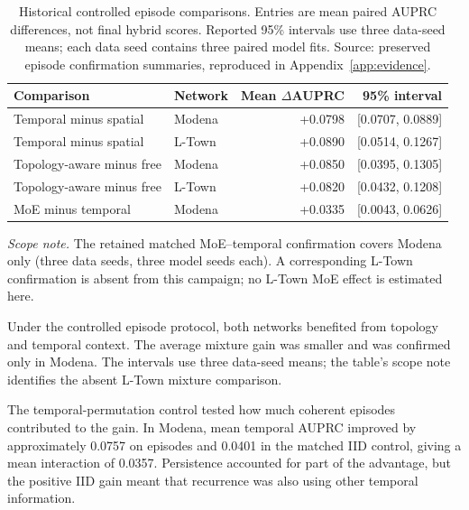 \begin{table}[tbp]
\centering\small
\caption[Historical controlled episode comparisons]{Historical controlled episode comparisons. Entries are mean paired AUPRC differences, not final hybrid scores. Reported 95\% intervals use three data-seed means; each data seed contains three paired model fits. Source: preserved episode confirmation summaries, reproduced in Appendix~\ref{app:evidence}.}
\label{tab:historical}
\begin{tabular}{@{}llrr@{}}
\toprule
Comparison & Network & Mean $\Delta$AUPRC & 95\% interval\\
\midrule
Temporal minus spatial & Modena & +0.0798 & [0.0707, 0.0889]\\
Temporal minus spatial & L-Town & +0.0890 & [0.0514, 0.1267]\\
Topology-aware minus free & Modena & +0.0850 & [0.0395, 0.1305]\\
Topology-aware minus free & L-Town & +0.0820 & [0.0432, 0.1208]\\
MoE minus temporal & Modena & +0.0335 & [0.0043, 0.0626]\\
\bottomrule
\end{tabular}
\par\smallskip\begin{minipage}{\linewidth}\footnotesize\textit{Scope note.} The retained matched MoE--temporal confirmation covers Modena only (three data seeds, three model seeds each). A corresponding L-Town confirmation is absent from this campaign; no L-Town MoE effect is estimated here.\end{minipage}
\end{table}

Under the controlled episode protocol, both networks benefited from topology and temporal context. The average mixture gain was smaller and was confirmed only in Modena. The intervals use three data-seed means; the table's scope note identifies the absent L-Town mixture comparison.


The temporal-permutation control tested how much coherent episodes contributed to the gain. In Modena, mean temporal AUPRC improved by approximately 0.0757 on episodes and 0.0401 in the matched IID control, giving a mean interaction of 0.0357. Persistence accounted for part of the advantage, but the positive IID gain meant that recurrence was also using other temporal information.

